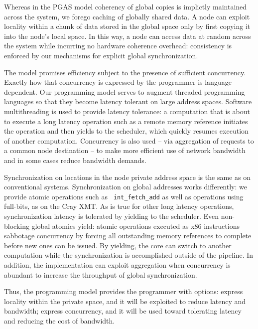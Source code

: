 \documentclass{acm_proc_article-sp}
\begin{document}
Whereas in the PGAS model coherency of global copies is implictly
maintained across the system, we forego caching of globally shared
data.  A node can exploit locality within a chunk of data stored in
the global space only by first copying it into the node's local space.
In this way, a node can access data at random across the system while
incurring no hardware coherence overhead: consistency is enforced by
our mechanisms for explicit global synchronization.

The model promises efficiency subject to the presence of sufficient
concurrency.  Exactly how that concurrency is expressed by the
programmer is language dependent.  Our programming model serves to
augment threaded programming languages so that they become latency
tolerant on large address spaces.  Software multithreading is used to
provide latency tolerance: a computation that is about to execute a
long latency operation such as a remote memory reference initiates the
operation and then yields to the scheduler, which quickly resumes
execution of another computation.  Concurrency is also used -- via
aggregation of requests to a common node destination -- to make more
efficient use of network bandwidth and in some cases reduce bandwidth
demands.

Synchronization on locations in the node private address space is the
same as on conventional systems.  Synchronization on global addresses
works differently: we provide atomic operations such as {\tt
  int\_fetch\_add} as well as operations using full-bits, as on the
Cray XMT.  As is true for other long latency operations,
synchronization latency is tolerated by yielding to the scheduler.
Even non-blocking global atomics yield: atomic operations executed as
x86 instructions sabbotage concurrency by forcing all outstanding
memory references to complete before new ones can be issued.  By
yielding, the core can switch to another computation while the
synchronization is accomplished outside of the pipeline.  In addition,
the implementation can exploit aggregation when concurrency is
abundant to increase the throughput of global synchronization.

Thus, the programming model provides the programmer with options: express
locality within the private space, and it will be exploited to reduce
latency and bandwidth; express concurrency, and it will be used toward
tolerating latency and reducing the cost of bandwidth.
\end{document}
